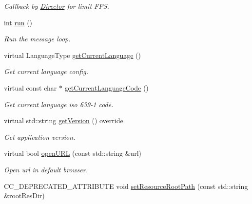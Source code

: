 \begin{DoxyCompactItemize}
\begin{DoxyCompactList}\small\item\em Callback by \hyperlink{classDirector}{Director} for limit F\+PS. \end{DoxyCompactList}\item 
\mbox{\label{classApplication_a8cf8941c8db90117d3735bce5ae1fdf4}} 
int \hyperlink{classApplication_a8cf8941c8db90117d3735bce5ae1fdf4}{run} ()
\begin{DoxyCompactList}\small\item\em Run the message loop. \end{DoxyCompactList}\item 
virtual Language\+Type \hyperlink{classApplication_a3fd3aeff0465fffe782af5b1441131c6}{get\+Current\+Language} ()
\begin{DoxyCompactList}\small\item\em Get current language config. \end{DoxyCompactList}\item 
virtual const char $\ast$ \hyperlink{classApplication_aed89715279c32959c41ec88fa65018a7}{get\+Current\+Language\+Code} ()
\begin{DoxyCompactList}\small\item\em Get current language iso 639-\/1 code. \end{DoxyCompactList}\item 
\mbox{\label{classApplication_ade1db7f4ab2a9e2b1aeb7950ac481ebd}} 
virtual std\+::string \hyperlink{classApplication_ade1db7f4ab2a9e2b1aeb7950ac481ebd}{get\+Version} () override
\begin{DoxyCompactList}\small\item\em Get application version. \end{DoxyCompactList}\item 
virtual bool \hyperlink{classApplication_a72b67fcc1ab0875ee67a95167c76db61}{open\+U\+RL} (const std\+::string \&url)
\begin{DoxyCompactList}\small\item\em Open url in default browser. \end{DoxyCompactList}\item 
C\+C\+\_\+\+D\+E\+P\+R\+E\+C\+A\+T\+E\+D\+\_\+\+A\+T\+T\+R\+I\+B\+U\+TE void \hyperlink{classApplication_a011ba0e9ba624c1e2efc36ad38f4d0b5}{set\+Resource\+Root\+Path} (const std\+::string \&root\+Res\+Dir)
\item 

\end{DoxyCompactItemize}
